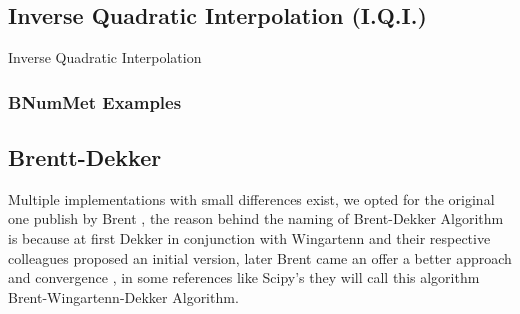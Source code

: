 \subsection*{Inverse Quadratic Interpolation (I.Q.I.)}
\begin{algorithm}[H]
\label{alg:IQI Method}

\SetAlgoLined

     \caption{Inverse Quadratic Interpolation}
     
\end{algorithm}
\subsubsection*{BNumMet Examples}


\subsection*{Brentt-Dekker}
Multiple implementations with small differences exist, we opted for the original one publish by Brent \cite{brent2002algorithms}, the reason behind the naming of Brent-Dekker Algorithm is because at first Dekker in conjunction with Wingartenn and their respective colleagues proposed an initial version, later Brent came an offer a better approach and convergence \cite{Press2007}, in some references like Scipy's they will call this algorithm Brent-Wingartenn-Dekker Algorithm.


